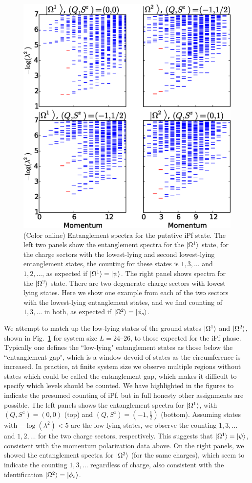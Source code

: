 \begin{figure}%
	\includegraphics[width=0.6\linewidth]{figures/nonabelian_spectra.eps}
	\caption{(Color online)
		Entanglement spectra for the putative iPf state.
		The left two panels show the entanglement spectra for the $\ket{\Omega^1}$ state, for the charge sectors with the lowest-lying and second lowest-lying entanglement states, the counting for these states is $1,3,...$ and $1,2,...$, as expected if $\ket{\Omega^1}=\ket{\psi}$.
		The right panel shows spectra for the $\ket{\Omega^2}$ state.
		There are two degenerate charge sectors with lowest lying states.
		Here we show one example from each of the two sectors with the lowest-lying entanglement states, and we find counting of $1,3,\dots$ in both, as expected if $\ket{\Omega^2}=\ket{{\phi_s}}$.
	}
	\label{pfaffspectra}
\end{figure}

We attempt to match up the low-lying states of the ground states $\ket{\Omega^1}$ and $\ket{\Omega^2}$, shown in Fig.~\ref{pfaffspectra} for system size $L=24\mbox{--}26$, to those expected for the iPf phase.
Typically one defines the ``low-lying" entanglement states as those below the ``entanglement gap", which is a window devoid of states as the circumference is increased.
In practice, at finite system size we observe multiple regions without states which could be called the entanglement gap, which makes it difficult to specify which levels should be counted.
We have highlighted in the figures to indicate the presumed counting of iPf, but in full honesty other assignments are possible.
The left panels shows the entanglement spectra for $\ket{\Omega^1}$, with $(Q,S^z) = (0,0)$ (top) and $(Q,S^z) = (-1,\frac12)$ (bottom).
Assuming states with $-\log(\lambda^2) < 5$ are the low-lying states, we observe the counting $1,3,\dots$ and $1,2,\dots$ for the two charge sectors, respectively.
This suggests that $\ket{\Omega^1} = \ket{\psi}$, consistent with the momentum polarization data above.
On the right panels, we showed the entanglement spectra for $\ket{\Omega^2}$ (for the same charges), which seem to indicate the counting $1,3,\dots$ regardless of charge, also consistent with the identification $\ket{\Omega^2} = \ket{{\phi_s}}$. 

